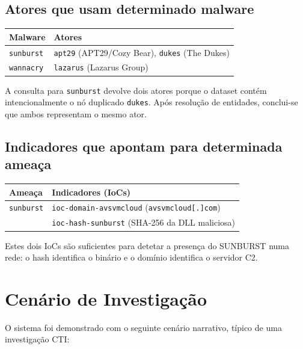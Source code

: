 \documentclass[12pt,a4paper]{article}
\begin{document}
\subsection{Atores que usam determinado malware}

\begin{center}
\begin{tabular}{ll}
\toprule
\textbf{Malware} & \textbf{Atores} \\
\midrule
\texttt{sunburst}  & \texttt{apt29} (APT29/Cozy Bear), \texttt{dukes} (The Dukes) \\
\texttt{wannacry}  & \texttt{lazarus} (Lazarus Group) \\
\bottomrule
\end{tabular}
\end{center}

A consulta para \texttt{sunburst} devolve dois atores porque o dataset contém intencionalmente o nó duplicado \texttt{dukes}. Após resolução de entidades, conclui-se que ambos representam o mesmo ator.

\subsection{Indicadores que apontam para determinada ameaça}

\begin{center}
\begin{tabular}{ll}
\toprule
\textbf{Ameaça} & \textbf{Indicadores (IoCs)} \\
\midrule
\texttt{sunburst} & \texttt{ioc-domain-avsvmcloud} (\texttt{avsvmcloud[.]com}) \\
                  & \texttt{ioc-hash-sunburst} (SHA-256 da DLL maliciosa) \\
\bottomrule
\end{tabular}
\end{center}

Estes dois IoCs são suficientes para detetar a presença do SUNBURST numa rede: o hash identifica o binário e o domínio identifica o servidor C2.

\section{Cenário de Investigação}

O sistema foi demonstrado com o seguinte cenário narrativo, típico de uma investigação CTI:
\end{document}
